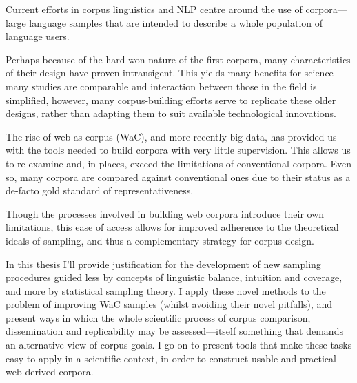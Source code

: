 Current efforts in corpus linguistics and NLP centre around the use of corpora---large language samples that are intended to describe a whole population of language users.


Perhaps because of the hard-won nature of the first corpora, many characteristics of their design have proven intransigent.  This yields many benefits for science---many studies are comparable and interaction between those in the field is simplified, however, many corpus-building efforts serve to replicate these older designs, rather than adapting them to suit available technological innovations.

The rise of web as corpus (WaC), and more recently big data, has provided us with the tools needed to build corpora with very little supervision.  This allows us to re-examine and, in places, exceed the limitations of conventional corpora.  Even so, many corpora are compared against conventional ones due to their status as a de-facto gold standard of representativeness.

Though the processes involved in building web corpora introduce their own limitations, this ease of access allows for improved adherence to the theoretical ideals of sampling, and thus a complementary strategy for corpus design.


In this thesis I'll provide justification for the development of new sampling procedures guided less by concepts of linguistic balance, intuition and coverage, and more by statistical sampling theory.  I apply these novel methods to the problem of improving WaC samples (whilst avoiding their novel pitfalls), and present ways in which the whole scientific process of corpus comparison, dissemination and replicability may be assessed---itself something that demands an alternative view of corpus goals.  I go on to present tools that make these tasks easy to apply in a scientific context, in order to construct usable and practical web-derived corpora.


